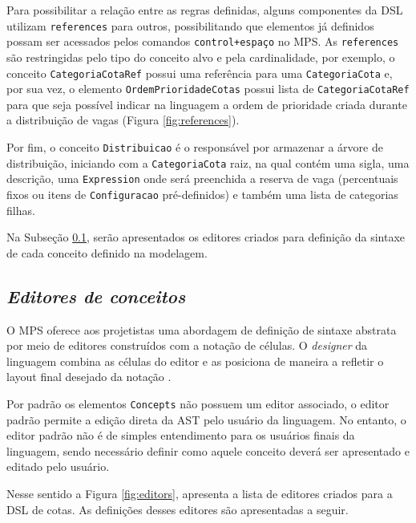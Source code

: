 Para possibilitar a relação entre as regras definidas, alguns componentes da \gls{DSL} utilizam \texttt{references} para outros, possibilitando que elementos já definidos possam ser acessados pelos comandos \texttt{control+espaço} no \gls{MPS}. As \texttt{references} são restringidas pelo tipo do conceito alvo e pela cardinalidade, por exemplo, o conceito \texttt{CategoriaCotaRef} possui uma referência para uma \texttt{CategoriaCota} e, por sua vez, o elemento \texttt{OrdemPrioridadeCotas} possui lista de \texttt{CategoriaCotaRef} para que seja possível indicar na linguagem a ordem de prioridade criada durante a distribuição de vagas (Figura \ref{fig:references}).



\newpage
Por fim, o conceito \texttt{Distribuicao} é o responsável por armazenar a árvore de distribuição, iniciando com a \texttt{CategoriaCota} raiz, na qual contém uma sigla, uma descrição, uma \texttt{Expression} onde será preenchida a reserva de vaga (percentuais fixos ou itens de \texttt{Configuracao} pré-definidos) e também uma lista de categorias filhas. 

Na Subseção \ref{sub:sec:editores}, serão apresentados os editores criados para definição da sintaxe de cada conceito definido na modelagem.


\subsection{\textit{Editores de conceitos}}
\label{sub:sec:editores}
O \gls{MPS} oferece aos projetistas uma abordagem de definição de sintaxe abstrata por meio de editores construídos com a notação de células. O \textit{designer} da linguagem combina as células do editor e as posiciona de maneira a refletir o layout final desejado da notação \cite{mpsCookBook}. 

Por padrão os elementos \texttt{Concepts} não possuem um editor associado, o editor padrão permite a edição direta da \gls{AST} pelo usuário da linguagem. No entanto, o editor padrão não é de simples entendimento para os usuários finais da linguagem, sendo necessário definir como aquele conceito deverá ser apresentado e editado pelo usuário.

Nesse sentido a Figura \ref{fig:editors}, apresenta a lista de editores criados para a DSL de cotas. As definições desses editores são apresentadas a seguir.




